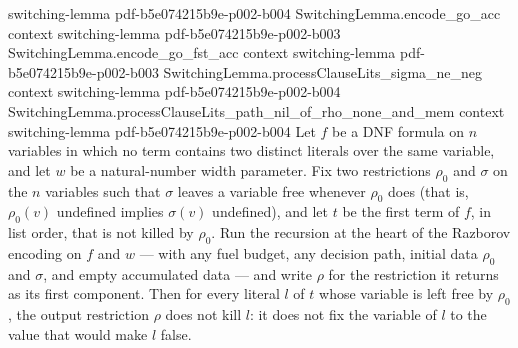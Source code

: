 \begin{lemma}
  {switching-lemma}
  {pdf-b5e074215b9e-p002-b004}
\proofstep
  {SwitchingLemma.encode_go_acc}
  {context}
  {switching-lemma}
  {pdf-b5e074215b9e-p002-b003}
\proofstep
  {SwitchingLemma.encode_go_fst_acc}
  {context}
  {switching-lemma}
  {pdf-b5e074215b9e-p002-b003}
\proofstep
  {SwitchingLemma.processClauseLits_sigma_ne_neg}
  {context}
  {switching-lemma}
  {pdf-b5e074215b9e-p002-b004}
\proofstep
  {SwitchingLemma.processClauseLits_path_nil_of_rho_none_and_mem}
  {context}
  {switching-lemma}
  {pdf-b5e074215b9e-p002-b004}
Let $f$ be a DNF formula on $n$ variables in which no term contains two distinct
literals over the same variable, and let $w$ be a natural-number width parameter. Fix
two restrictions $\rho_0$ and $\sigma$ on the $n$ variables such that $\sigma$ leaves a
variable free whenever $\rho_0$ does (that is, $\rho_0(v)$ undefined implies $\sigma(v)$
undefined), and let $t$ be the first term of $f$, in list order, that is not killed by
$\rho_0$. Run the recursion at the heart of the Razborov encoding on $f$ and $w$ — with
any fuel budget, any decision path, initial data $\rho_0$ and $\sigma$, and empty
accumulated data — and write $\rho$ for the restriction it returns as its first
component. Then for every literal $l$ of $t$ whose variable is left free by $\rho_0$,
the output restriction $\rho$ does not kill $l$: it does not fix the variable of $l$ to
the value that would make $l$ false.
\end{lemma}
